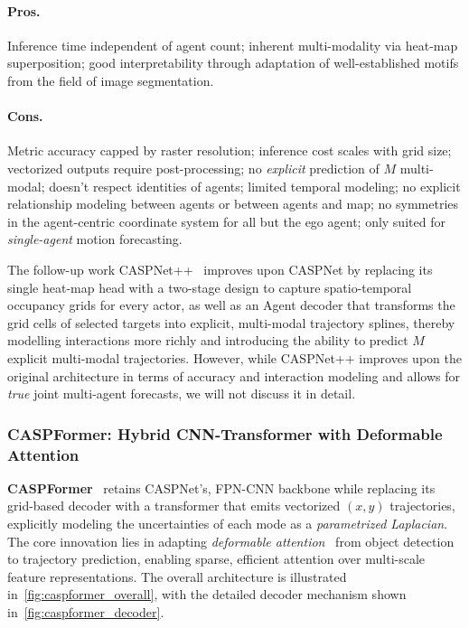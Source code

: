 \begin{description}[leftmargin=1em,itemsep=2pt]
\paragraph{Pros.} Inference time independent of agent count; inherent multi-modality via heat-map superposition; good interpretability through adaptation of well-established motifs from the field of image segmentation.
\paragraph{Cons.} Metric accuracy capped by raster resolution; inference cost scales with grid size; vectorized outputs require post-processing; no \emph{explicit} prediction of \( M \) multi-modal; doesn't respect identities of agents; limited temporal modeling; no explicit relationship modeling between agents or between agents and map; no symmetries in the agent-centric coordinate system for all but the ego agent; only suited for \emph{single-agent} motion forecasting.

The follow-up work CASPNet++~\cite{caspnetppSchäfer2023} improves upon CASPNet by replacing its single heat-map head with a two-stage design to capture spatio-temporal occupancy grids for every actor, as well as an Agent decoder that transforms the grid cells of selected targets into explicit, multi-modal trajectory splines, thereby modelling interactions more richly and introducing the ability to predict \( M \) explicit multi-modal trajectories. However, while CASPNet++ improves upon the original architecture in terms of accuracy and interaction modeling and allows for \emph{true} joint multi-agent forecasts, we will not discuss it in detail.

\subsubsection*{CASPFormer: Hybrid CNN-Transformer with Deformable Attention}
\label{ssec:caspformer}

\textbf{CASPFormer}~\cite{caspformerYadav2024} retains CASPNet's, FPN-CNN backbone while replacing its grid-based decoder with a transformer that emits vectorized \((x,y)\) trajectories, explicitly modeling the uncertainties of each mode as a \emph{parametrized Laplacian}. The core innovation lies in adapting \emph{deformable attention}~\cite{zhu2021deformabledetr} from object detection to trajectory prediction, enabling sparse, efficient attention over multi-scale feature representations. The overall architecture is illustrated in~\autoref{fig:caspformer_overall}, with the detailed decoder mechanism shown in~\autoref{fig:caspformer_decoder}.


\end{description}
